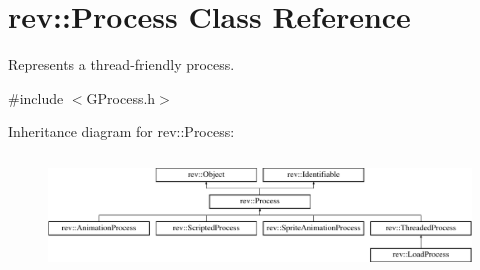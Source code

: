 \hypertarget{classrev_1_1_process}{}\section{rev\+::Process Class Reference}
\label{classrev_1_1_process}


Represents a thread-\/friendly process.  




{\ttfamily \#include $<$G\+Process.\+h$>$}

Inheritance diagram for rev\+::Process\+:\begin{figure}[H]
\begin{center}
\leavevmode
\includegraphics[height=3.128492cm]{classrev_1_1_process}
\end{center}
\end{figure}
